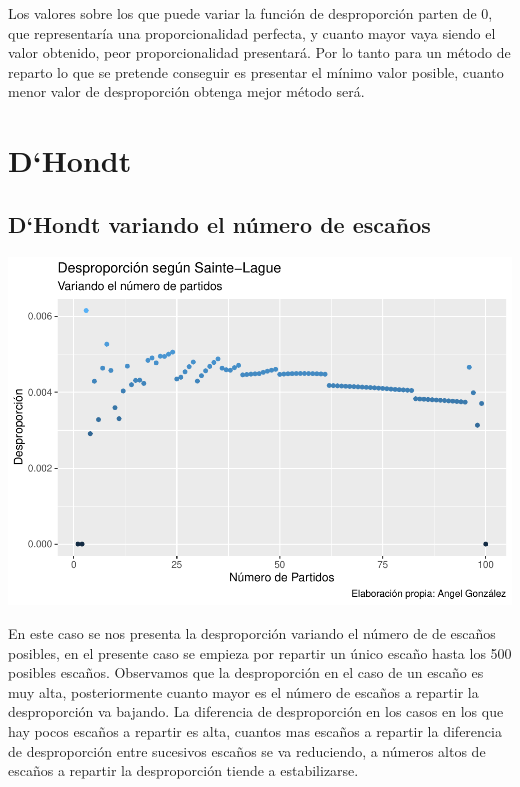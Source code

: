 \documentclass[12pt,a4paper,]{book}
\numberwithin{dummy}{section}
\theoremstyle{ocrenumbox}
\theoremstyle{blacknumex}
\theoremstyle{blacknumbox}
\theoremstyle{ocrenum}
\theoremstyle{ocrenum}
\begin{document}
Los valores sobre los que puede variar la función de desproporción
parten de 0, que representaría una proporcionalidad perfecta, y cuanto
mayor vaya siendo el valor obtenido, peor proporcionalidad presentará.
Por lo tanto para un método de reparto lo que se pretende conseguir es
presentar el mínimo valor posible, cuanto menor valor de desproporción
obtenga mejor método será.

\hypertarget{dhondt}{%
\section{D`Hondt}\label{dhondt}}

\hypertarget{dhondt-variando-el-nuxfamero-de-escauxf1os}{%
\subsection{D`Hondt variando el número de
escaños}\label{dhondt-variando-el-nuxfamero-de-escauxf1os}}

\begin{center}\includegraphics[width=0.95\linewidth]{figurasR/unnamed-chunk-12-1} \end{center}

En este caso se nos presenta la desproporción variando el número de de
escaños posibles, en el presente caso se empieza por repartir un único
escaño hasta los 500 posibles escaños. Observamos que la desproporción
en el caso de un escaño es muy alta, posteriormente cuanto mayor es el
número de escaños a repartir la desproporción va bajando. La diferencia
de desproporción en los casos en los que hay pocos escaños a repartir es
alta, cuantos mas escaños a repartir la diferencia de desproporción
entre sucesivos escaños se va reduciendo, a números altos de escaños a
repartir la desproporción tiende a estabilizarse.
\end{document}
